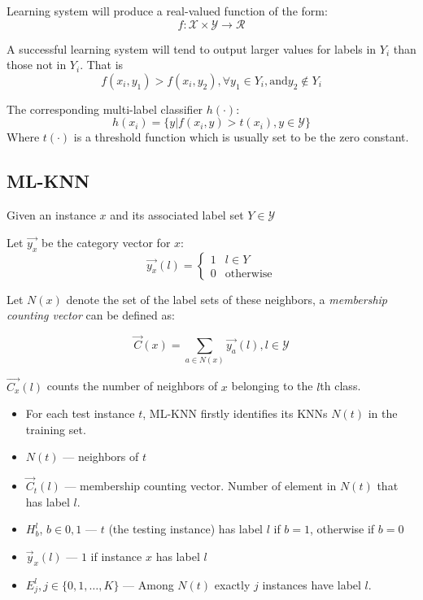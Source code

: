 Learning system will produce a real-valued function of the form:
\[ f: \mathcal{X} \times \mathcal{Y} \rightarrow \mathcal{R}\]

A successful learning system will tend to output larger values for labels
in $Y_i$ than those not in $Y_i$. That is
\[ f(x_i, y_1) > f(x_i, y_2), \forall y_1 \in Y_i, \mbox{and} y_2 \not\in
Y_i\]

The corresponding multi-label classifier $h(\cdot)$:
\[ h(x_i) = \{ y|f(x_i, y) > t(x_i), y \in \mathcal{Y}\}\]
Where $t(\cdot)$ is a threshold function which is usually set to be the
zero constant.

\subsection{ML-KNN}

Given an instance $x$ and its associated label set $Y\in \mathcal{Y}$

Let $\vec{y_x}$ be the category vector for $x$:
\[
    \vec{y_x}(l) = 
    \begin{cases}
    1 & l \in Y \\
    0 & \mbox{otherwise}
    \end{cases}
\]

Let $N(x)$ denote the set of the label sets of these neighbors, a
\emph{membership counting vector} can be defined as:

\[ \vec{C}(x) = \sum_{a \in N(x)}\vec{y_a}(l), l \in \mathcal{Y}\]

$\vec{C_x}(l)$ counts the number of neighbors of $x$ belonging to the
$l$th class.

\begin{itemize}
    \item  For each test instance $t$, ML-KNN firstly identifies its KNNs $N(t)$ in
        the training set.
    \item $N(t)$ --- neighbors of $t$
    \item $\vec{C}_t(l)$ --- membership counting vector. Number of element
        in $N(t)$ that has label $l$.
    \item $H_b^l$, $b \in {0, 1}$ --- $t$ (the testing instance) has label
        $l$ if $b = 1$, otherwise if $b = 0$
    \item $\vec{y}_x(l)$ --- $1$ if instance $x$ has label $l$
    \item $E_j^l, j \in \{0, 1, \dots, K\}$ --- Among $N(t)$ exactly $j$ instances have label $l$.
\end{itemize}

